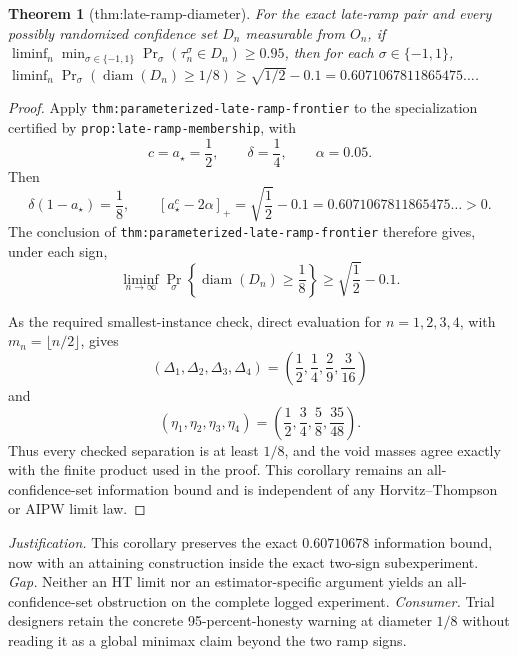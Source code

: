 \documentclass{article}
\newtheorem{theorem}{Theorem}
\begin{document}
\begin{theorem}[thm:late-ramp-diameter]\label{thm:late-ramp-diameter}
For the exact late-ramp pair and every possibly randomized confidence set \(D_n\) measurable from \(O_n\), if \(\liminf_n\min_{\sigma\in\{-1,1\}}\Pr_{\sigma}(\tau_n^{\sigma}\in D_n)\ge0.95\), then for each \(\sigma\in\{-1,1\}\), \(\liminf_n\Pr_{\sigma}(\operatorname{diam}(D_n)\ge1/8)\ge\sqrt{1/2}-0.1=0.6071067811865475\ldots\).
\end{theorem}
\begin{proof}
Apply \texttt{thm:parameterized-late-ramp-frontier} to the specialization certified by \texttt{prop:late-ramp-membership}, with
\[
 c=a_\star=\frac12,\qquad
 \delta=\frac14,\qquad
 \alpha=0.05.
\]
Then
\[
 \delta(1-a_\star)=\frac18,
 \qquad
 [a_\star^c-2\alpha]_+
 =\sqrt{\frac12}-0.1
 =0.6071067811865475\ldots>0.
\]
The conclusion of \texttt{thm:parameterized-late-ramp-frontier} therefore gives, under each sign,
\[
 \liminf_{n\to\infty}
 \Pr_\sigma\!\left\{\operatorname{diam}(D_n)\ge\frac18\right\}
 \ge\sqrt{\frac12}-0.1.
\]

As the required smallest-instance check, direct evaluation for \(n=1,2,3,4\), with \(m_n=\lfloor n/2\rfloor\), gives
\[
 (\Delta_1,\Delta_2,\Delta_3,\Delta_4)
 =\left(\frac12,\frac14,\frac29,\frac3{16}\right)
\]
and
\[
 (\eta_1,\eta_2,\eta_3,\eta_4)
 =\left(\frac12,\frac34,\frac58,\frac{35}{48}\right).
\]
Thus every checked separation is at least \(1/8\), and the void masses agree exactly with the finite product used in the proof. This corollary remains an all-confidence-set information bound and is independent of any Horvitz--Thompson or AIPW limit law.
\end{proof}
\par\smallskip\noindent \textit{Justification.} This corollary preserves the exact \(0.60710678\) information bound, now with an attaining construction inside the exact two-sign subexperiment. \textit{Gap.} Neither an HT limit nor an estimator-specific argument yields an all-confidence-set obstruction on the complete logged experiment. \textit{Consumer.} Trial designers retain the concrete 95-percent-honesty warning at diameter \(1/8\) without reading it as a global minimax claim beyond the two ramp signs.
\end{document}
